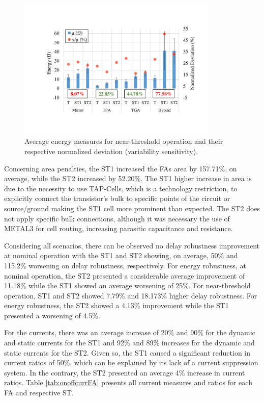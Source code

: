 \documentclass[pgmicro,diss,english]{iiufrgs}
\begin{document}
\begin{figure}[h]
  \centering
    \includegraphics[width=0.85\textwidth, trim={3.5cm 3cm 2cm 3.5cm}, clip]{averageEnergyNT.pdf}
     \caption{Average energy measures for near-threshold operation and their respective normalized deviation (variability sensitivity).}
  \label{fig:avgEnergyNT}
\end{figure}

Concerning area penalties, the ST1 increased the FAs area by 157.71\%, on average, while the ST2 increased by 52.20\%. The ST1 higher increase in area is due to the necessity to use TAP-Cells, which is a technology restriction, to explicitly connect the transistor's bulk to specific points of the circuit or source/ground making the ST1 cell more prominent than expected. The ST2 does not apply specific bulk connections, although it was necessary the use of METAL3 for cell routing, increasing parasitic capacitance and resistance.

Considering all scenarios, there can be observed no delay robustness improvement at nominal operation with the ST1 and ST2 showing, on average, 50\% and 115.2\% worsening on delay robustness, respectively. For energy robustness, at nominal operation, the ST2 presented a considerable average improvement of 11.18\% while the ST1 showed an average worsening of 25\%. For near-threshold operation, ST1 and ST2 showed 7.79\% and 18.173\% higher delay robustness. For energy robustness, the ST2 showed a 4.13\% improvement while the ST1 presented a worsening of 4.5\%.


For the currents, there was an average increase of 20\% and 90\% for the dynamic and static currents for the ST1 and 92\% and 89\% increases for the dynamic and static currents for the ST2. Given so, the ST1 caused a significant reduction in current ratios of 50\%, which can be explained by its lack of a current suppression system. In the contrary, the ST2 presented an average 4\% increase in current ratios. Table \ref{tab:onoffcurrFA} presents all current measures and ratios for each FA and respective ST.
\end{document}
